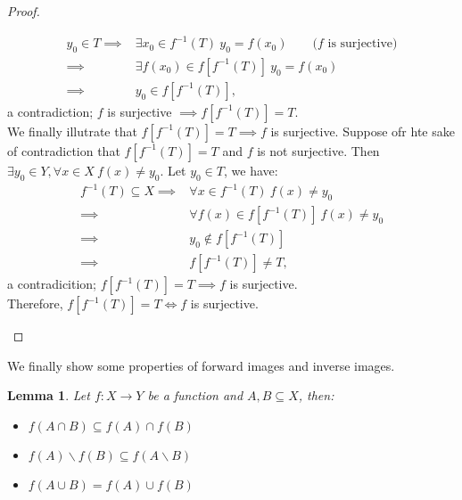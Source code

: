 \documentclass[a4paper]{book}
\newtheorem*{proof}{\textit{Proof.}}
\theoremstyle{break}
\newtheorem{lemma}{Lemma}[section]
\begin{document}
\begin{proof}
\begin{itemize}
					\begin{align*}
						y_0\in T\implies & \exists x_0\in f^{-1}(T)~y_0=f(x_0)\qquad\text{($f$ is surjective)}\\
						\implies & \exists f(x_0)\in f[f^{-1}(T)]~y_0=f(x_0)\\
						\implies & y_0\in f[f^{-1}(T)],
					\end{align*}
					a contradiction; $f$ is surjective $\implies f[f^{-1}(T)]=T$.\\
					We finally illutrate that $f[f^{-1}(T)]=T\implies f$ is surjective. Suppose ofr hte sake of contradiction that $f[f^{-1}(T)]=T$ and $f$ is not surjective. Then $\exists y_0\in Y, \forall x\in X~f(x)\neq y_0$. Let $y_0\in T$, we have:
					\begin{align*}
						f^{-1}(T)\subseteq X\implies &\forall x\in f^{-1}(T)~f(x)\neq y_0\\
						\implies & \forall f(x)\in f[f^{-1}(T)]~f(x)\neq y_0\\
						\implies & y_0\notin f[f^{-1}(T)]\\
						\implies & f[f^{-1}(T)]\neq T,
					\end{align*}
					a contradicition; $f[f^{-1}(T)]=T\implies f$ is surjective.\\
					Therefore, $f[f^{-1}(T)]=T\iff f$ is surjective.
				\end{itemize}
			\end{proof}
			We finally show some properties of forward images and inverse images.
			\begin{lemma}
				Let $f:X\to Y$ be a function and $A,B\subseteq X$, then:
				\begin{itemize}
					\item $f(A\cap B)\subseteq f(A)\cap f(B)$
					\item $f(A)\backslash f(B)\subseteq f(A\backslash B)$
					\item $f(A\cup B)=f(A)\cup f(B)$
				\end{itemize}
			\end{lemma}
\end{document}
